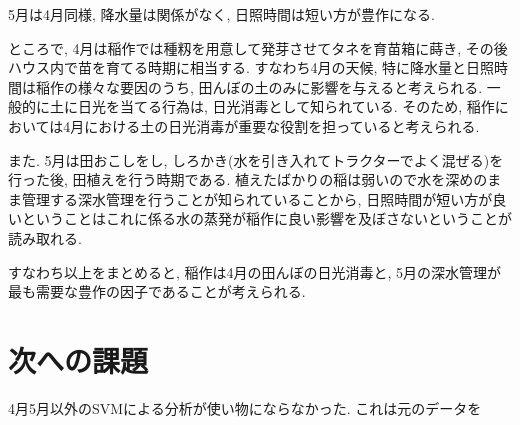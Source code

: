 \documentclass{jarticle}
\begin{document}
5月は4月同様, 降水量は関係がなく, 日照時間は短い方が豊作になる.

ところで, 4月は稲作では種籾を用意して発芽させてタネを育苗箱に蒔き, その後ハウス内で苗を育てる時期に相当する. すなわち4月の天候, 特に降水量と日照時間は稲作の様々な要因のうち, 田んぼの土のみに影響を与えると考えられる. 一般的に土に日光を当てる行為は, 日光消毒として知られている. そのため, 稲作においては4月における土の日光消毒が重要な役割を担っていると考えられる.

また. 5月は田おこしをし, しろかき(水を引き入れてトラクターでよく混ぜる)を行った後, 田植えを行う時期である. 植えたばかりの稲は弱いので水を深めのまま管理する深水管理を行うことが知られていることから, 日照時間が短い方が良いということはこれに係る水の蒸発が稲作に良い影響を及ぼさないということが読み取れる.

すなわち以上をまとめると, 稲作は4月の田んぼの日光消毒と, 5月の深水管理が最も需要な豊作の因子であることが考えられる.


\section{次への課題}
4月5月以外のSVMによる分析が使い物にならなかった. これは元のデータを

\end{document}
